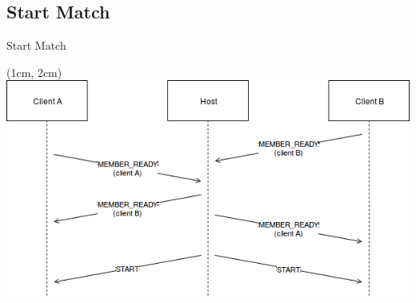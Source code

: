 \subsection{Start Match}
\begin{frame}{Start Match}
  
  \begin{textblock*}{5cm}(1cm, 2cm)
   \includegraphics[scale=0.51]{../report/res/img/StartMatch}
  \end{textblock*}

\end{frame}
